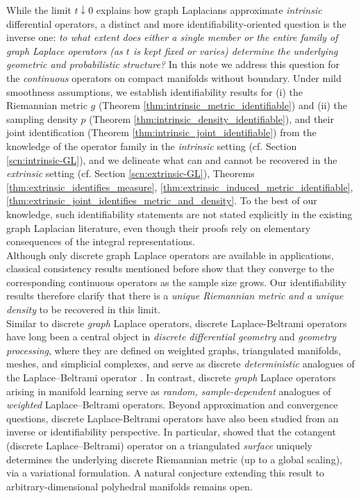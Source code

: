 \documentclass{amsart}
\let\oldcite\cite
\renewcommand{\cite}[1]{{\color{red}\oldcite{#1}}}
\theoremstyle{definition}
\theoremstyle{remark}
\newcommand{\nd}{\noindent}
\newcommand{\0}{\boldsymbol{0}}
\begin{document}
\nd While the limit $t\downarrow 0$ explains how graph Laplacians approximate \textit{intrinsic }differential operators, a distinct and more
identifiability-oriented question is the inverse one:
\emph{to what extent does either a single member or the entire family of graph Laplace operators (as $t$ is kept fixed or varies) determine the underlying
geometric and probabilistic structure?}
In this note we address this question for the \textit{continuous} operators on compact manifolds without boundary.
Under mild smoothness assumptions, we establish identifiability results for (i) the Riemannian metric $g$ (Theorem \ref{thm:intrinsic_metric_identifiable}) and
(ii) the sampling density $p$ (Theorem \ref{thm:intrinsic_density_identifiable}), and their joint identification (Theorem \ref{thm:intrinsic_joint_identifiable}) from the knowledge of the operator family in the \textit{intrinsic} setting (cf. Section \ref{scn:intrinsic-GL}), and we delineate
what can and cannot be recovered in the\textit{ extrinsic} setting (cf. Section \ref{scn:extrinsic-GL}), Theorems \ref{thm:extrinsic_identifies_measure}, \ref{thm:extrinsic_induced_metric_identifiable}, \ref{thm:extrinsic_joint_identifies_metric_and_density}.
To the best of our knowledge, such identifiability statements are not stated explicitly in the existing graph Laplacian literature, even though their proofs rely on elementary consequences of the integral representations.\\

\nd Although only discrete graph Laplace operators are available in applications, classical consistency results mentioned before show that they converge to the corresponding continuous operators as the sample size grows. Our identifiability results therefore clarify that there is a \textit{unique Riemannian metric} \textit{and}  \textit{a unique density} to be recovered in this limit.\\

\noindent Similar to discrete \textit{graph} Laplace operators, discrete Laplace-Beltrami operators have long been
a central object in \textit{discrete differential geometry} and \textit{geometry processing},
where they are defined on weighted graphs, triangulated manifolds, meshes, and simplicial complexes,
and serve as discrete \emph{deterministic} analogues of the Laplace--Beltrami operator
\cite{BobenkoSuris2008}. In contrast, discrete \textit{graph} Laplace operators arising in manifold
learning serve as \emph{random, sample-dependent} analogues of \textit{weighted}
Laplace--Beltrami operators. Beyond approximation and convergence questions, discrete Laplace-Beltrami operators have also been studied
from an inverse or identifiability perspective. In particular, \cite{GuGuoLuoZeng2010} showed that
the cotangent (discrete Laplace--Beltrami) operator on a triangulated \textit{surface} uniquely
determines the underlying discrete Riemannian metric (up to a global scaling), via a variational
formulation. A natural conjecture extending this result to arbitrary-dimensional polyhedral
manifolds remains open.
\end{document}
